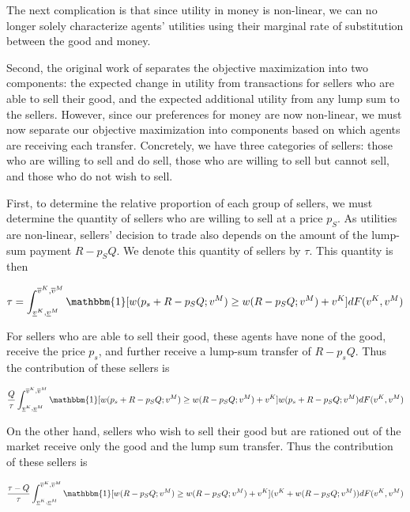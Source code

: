 \documentclass[AER]{AEA}
\begin{document}
The next complication is that since utility in money is non-linear, we can no longer solely characterize agents' utilities using their marginal rate of substitution between the good and money.

Second, the original work of \cite{dworczak-2020} separates the objective maximization into two components: the expected change in utility from transactions for sellers who are able to sell their good, and the expected additional utility from any lump sum to the sellers. However, since our preferences for money are now non-linear, we must now separate our objective maximization into components based on which agents are receiving each transfer. Concretely, we have three categories of sellers: those who are willing to sell and do sell, those who are willing to sell but cannot sell, and those who do not wish to sell.

First, to determine the relative proportion of each group of sellers, we must determine the quantity of sellers who are willing to sell at a price $p_S$. As utilities are non-linear, sellers' decision to trade also depends on the amount of the lump-sum payment $R - p_S Q$. We denote this quantity of sellers by $\tau$. This quantity is then

$$
\tau = \int_{\underline{v}^K, \underline{v}^M}^{\overline{v}^K, \overline{v}^M} \mathbbm{1}[w(p_s + R - p_SQ; v^M) \ge w(R - p_S Q ; v^M) + v^K] dF(v^K, v^M)
$$

For sellers who are able to sell their good, these agents have none of the good, receive the price $p_s$, and further receive a lump-sum transfer of $R - p_s Q$. Thus the contribution of these sellers is

\begin{equation}
    \frac{Q}{\tau} \int_{\underline{v}^K, \underline{v}^M}^{\overline{v}^K, \overline{v}^M} \mathbbm{1}[w(p_s + R - p_SQ; v^M) \ge w(R - p_S Q ; v^M) + v^K] w(p_s + R - p_SQ; v^M) dF(v^K, v^M)
\end{equation}

On the other hand, sellers who wish to sell their good but are rationed out of the market receive only the good and the lump sum transfer. Thus the contribution of these sellers is

\begin{equation}
    \frac{\tau - Q}{\tau} \int_{\underline{v}^K, \underline{v}^M}^{\overline{v}^K, \overline{v}^M} \mathbbm{1}[w(R - p_SQ; v^M) \ge w(R - p_S Q ; v^M) + v^K] (v^K + w(R - p_SQ; v^M)) dF(v^K, v^M)
\end{equation}
\end{document}
